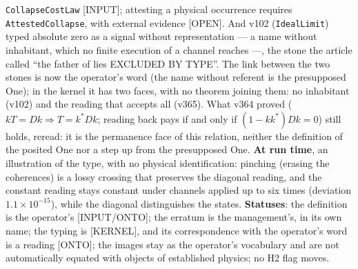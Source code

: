 \documentclass[11pt]{article}
\theoremstyle{definition}\newtheorem{deriv}{Derivation}
\begin{document}
\texttt{CollapseCostLaw} [INPUT]; attesting a physical occurrence requires \texttt{AttestedCollapse}, with external evidence [OPEN]. And v102 (\texttt{IdealLimit}) typed absolute zero as a signal without representation --- a name without inhabitant, which no finite execution of a channel reaches ---, the stone the article called ``the father of lies EXCLUDED BY TYPE''. The link between the two stones is now the operator's word (the name without referent is the presupposed One); in the kernel it has two faces, with no theorem joining them: no inhabitant (v102) and the reading that accepts all (v365). What v364 proved ($kT=Dk\Rightarrow T=k^*Dk$; reading back pays if and only if $(1-kk^*)Dk=0$) still holds, reread: it is the permanence face of this relation, neither the definition of the posited One nor a step up from the presupposed One. \textbf{At run time}, an illustration of the type, with no physical identification: pinching (erasing the coherences) is a lossy crossing that preserves the diagonal reading, and the constant reading stays constant under channels applied up to six times (deviation $1.1\times10^{-15}$), while the diagonal distinguishes the states. \textbf{Statuses}: the definition is the operator's [INPUT/ONTO]; the erratum is the management's, in its own name; the typing is [KERNEL], and its correspondence with the operator's word is a reading [ONTO]; the images stay as the operator's vocabulary and are not automatically equated with objects of established physics; no H2 flag moves.
\end{document}
